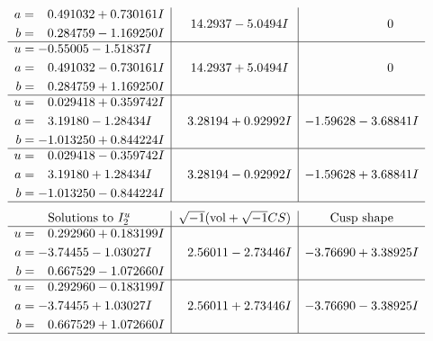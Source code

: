 \documentclass[1p]{elsarticle_modified}
\theoremstyle{definition}
\newcommand{\I}{\sqrt{-1}}
\begin{document}
$$\begin{array}{c|c|c}
\begin{aligned}
a &= \phantom{-}0.491032 + 0.730161 I \\
b &= \phantom{-}0.284759 - 1.169250 I\end{aligned}
 & \phantom{-}14.2937 - 5.0494 I & \phantom{-0.000000 } 0 \\ \hline\begin{aligned}
u &= -0.55005 - 1.51837 I \\
a &= \phantom{-}0.491032 - 0.730161 I \\
b &= \phantom{-}0.284759 + 1.169250 I\end{aligned}
 & \phantom{-}14.2937 + 5.0494 I & \phantom{-0.000000 } 0 \\ \hline\begin{aligned}
u &= \phantom{-}0.029418 + 0.359742 I \\
a &= \phantom{-}3.19180 - 1.28434 I \\
b &= -1.013250 + 0.844224 I\end{aligned}
 & \phantom{-}3.28194 + 0.92992 I & -1.59628 - 3.68841 I \\ \hline\begin{aligned}
u &= \phantom{-}0.029418 - 0.359742 I \\
a &= \phantom{-}3.19180 + 1.28434 I \\
b &= -1.013250 - 0.844224 I\end{aligned}
 & \phantom{-}3.28194 - 0.92992 I & -1.59628 + 3.68841 I\\
 \hline 
 \end{array}$$\newpage$$\begin{array}{c|c|c}  
\text{Solutions to }I^u_{2}& \I (\text{vol} + \sqrt{-1}CS) & \text{Cusp shape}\\
 \hline 
\begin{aligned}
u &= \phantom{-}0.292960 + 0.183199 I \\
a &= -3.74455 - 1.03027 I \\
b &= \phantom{-}0.667529 - 1.072660 I\end{aligned}
 & \phantom{-}2.56011 - 2.73446 I & -3.76690 + 3.38925 I \\ \hline\begin{aligned}
u &= \phantom{-}0.292960 - 0.183199 I \\
a &= -3.74455 + 1.03027 I \\
b &= \phantom{-}0.667529 + 1.072660 I\end{aligned}
 & \phantom{-}2.56011 + 2.73446 I & -3.76690 - 3.38925 I\\
 \hline 
 \end{array}$$\newpage\newpage\renewcommand{\arraystretch}{1}
\end{document}
